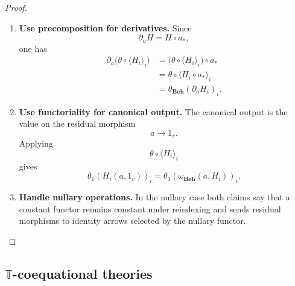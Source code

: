 \begin{proof}
    \leavevmode
    \begin{enumerate}
        \item \textbf{Use precomposition for derivatives.}
        Since
        \[
            \partial_aH=H\circ a_*,
        \]
        one has
        \[
        \begin{aligned}
            \partial_a\bigl(\theta\circ\langle H_i\rangle_i\bigr)
            &=
            \bigl(\theta\circ\langle H_i\rangle_i\bigr)\circ a_* \\
            &=
            \theta\circ\langle H_i\circ a_*\rangle_i \\
            &=
            \theta_{\mathbf{Beh}}(\partial_aH_i)_i.
        \end{aligned}
        \]

        \item \textbf{Use functoriality for canonical output.}
        The canonical output is the value on the residual morphism
        \[
            a\to 1_v.
        \]
        Applying
        \[
            \theta\circ\langle H_i\rangle_i
        \]
        gives
        \[
            \theta_1(H_i(a,1_v))_i
            =
            \theta_1(\omega_{\mathbf{Beh}}(a,H_i))_i.
        \]

        \item \textbf{Handle nullary operations.}
        In the nullary case both claims say that a constant functor remains
        constant under reindexing and sends residual morphisms to identity
        arrows selected by the nullary functor.
    \end{enumerate}
\end{proof}

\subsection{\texorpdfstring{\(\mathbb T\)}{T}-coequational theories}
\label{subsec:T-coequational-theories}

